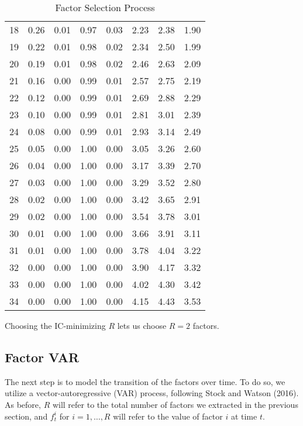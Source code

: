 \documentclass[11pt, letterpaper]{article}\usepackage[]{graphicx}\usepackage[]{color}
\begin{document}
\begin{table}[H]
\begin{tabular}{cccccccc}
   18 & 0.26 & 0.01 & 0.97 & 0.03 & 2.23 & 2.38 & 1.90 \\ 
   19 & 0.22 & 0.01 & 0.98 & 0.02 & 2.34 & 2.50 & 1.99 \\ 
   20 & 0.19 & 0.01 & 0.98 & 0.02 & 2.46 & 2.63 & 2.09 \\ 
   21 & 0.16 & 0.00 & 0.99 & 0.01 & 2.57 & 2.75 & 2.19 \\ 
   22 & 0.12 & 0.00 & 0.99 & 0.01 & 2.69 & 2.88 & 2.29 \\ 
   23 & 0.10 & 0.00 & 0.99 & 0.01 & 2.81 & 3.01 & 2.39 \\ 
   24 & 0.08 & 0.00 & 0.99 & 0.01 & 2.93 & 3.14 & 2.49 \\ 
   25 & 0.05 & 0.00 & 1.00 & 0.00 & 3.05 & 3.26 & 2.60 \\ 
   26 & 0.04 & 0.00 & 1.00 & 0.00 & 3.17 & 3.39 & 2.70 \\ 
   27 & 0.03 & 0.00 & 1.00 & 0.00 & 3.29 & 3.52 & 2.80 \\ 
   28 & 0.02 & 0.00 & 1.00 & 0.00 & 3.42 & 3.65 & 2.91 \\ 
   29 & 0.02 & 0.00 & 1.00 & 0.00 & 3.54 & 3.78 & 3.01 \\ 
   30 & 0.01 & 0.00 & 1.00 & 0.00 & 3.66 & 3.91 & 3.11 \\ 
   31 & 0.01 & 0.00 & 1.00 & 0.00 & 3.78 & 4.04 & 3.22 \\ 
   32 & 0.00 & 0.00 & 1.00 & 0.00 & 3.90 & 4.17 & 3.32 \\ 
   33 & 0.00 & 0.00 & 1.00 & 0.00 & 4.02 & 4.30 & 3.42 \\ 
   34 & 0.00 & 0.00 & 1.00 & 0.00 & 4.15 & 4.43 & 3.53 \\ 
   \hline
\end{tabular}
\endgroup
\caption{Factor Selection Process} 
\end{table}


Choosing the IC-minimizing $R$ lets us choose $R = 2$ factors.



\subsection{Factor VAR}
The next step is to model the transition of the factors over time. To do so, we utilize a vector-autoregressive (VAR) process, following Stock and Watson (2016). As before, $R$ will refer to the total number of factors we extracted in the previous section, and $f^i_t$ for $i = 1, \dots, R$ will refer to the value of factor $i$ at time $t$.
\end{document}
